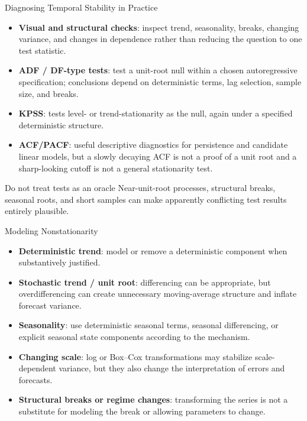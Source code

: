 \documentclass{beamer}
\begin{document}

\begin{frame}{Diagnosing Temporal Stability in Practice}
  \begin{itemize}
    \item \textbf{Visual and structural checks}: inspect trend, seasonality, breaks, changing variance, and changes in dependence rather than reducing the question to one test statistic.
    \item \textbf{ADF / DF-type tests}: test a unit-root null within a chosen autoregressive specification; conclusions depend on deterministic terms, lag selection, sample size, and breaks.
    \item \textbf{KPSS}: tests level- or trend-stationarity as the null, again under a specified deterministic structure.
    \item \textbf{ACF/PACF}: useful descriptive diagnostics for persistence and candidate linear models, but a slowly decaying ACF is not a proof of a unit root and a sharp-looking cutoff is not a general stationarity test.
  \end{itemize}
  \begin{alertblock}{Do not treat tests as an oracle}
    Near-unit-root processes, structural breaks, seasonal roots, and short samples can make apparently conflicting test results entirely plausible.
  \end{alertblock}
\end{frame}
\begin{frame}{Modeling Nonstationarity}
  \begin{itemize}
    \item \textbf{Deterministic trend}: model or remove a deterministic component when substantively justified.
    \item \textbf{Stochastic trend / unit root}: differencing can be appropriate, but overdifferencing can create unnecessary moving-average structure and inflate forecast variance.
    \item \textbf{Seasonality}: use deterministic seasonal terms, seasonal differencing, or explicit seasonal state components according to the mechanism.
    \item \textbf{Changing scale}: log or Box--Cox transformations may stabilize scale-dependent variance, but they also change the interpretation of errors and forecasts.
    \item \textbf{Structural breaks or regime changes}: transforming the series is not a substitute for modeling the break or allowing parameters to change.
  \end{itemize}
\end{frame}
\end{document}
